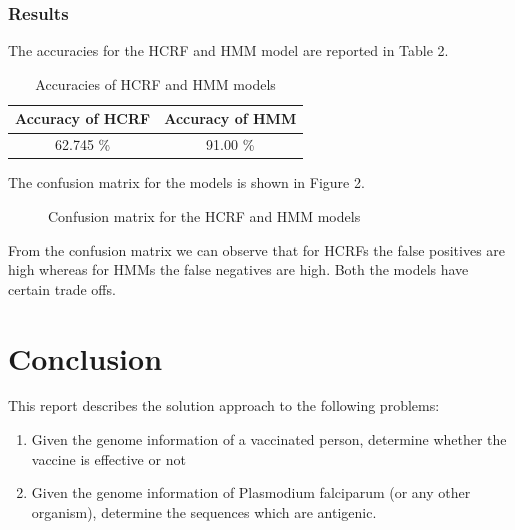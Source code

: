 \documentclass[notitlepage]{article}
\begin{document}
	\subsubsection{Results}
	
	The accuracies for the HCRF and HMM model are reported in Table 2. 
		
	\begin{table}
		\centering
		\caption{Accuracies of HCRF and HMM models}
		\label{Accuracies2}
		\begin{tabular}{|c|c|}
		\hline Accuracy of HCRF & Accuracy of HMM \\ 
		\hline 62.745 \% & 91.00 \% \\ \hline
		\end{tabular}
	\end{table}
	
	The confusion matrix for the models is shown in Figure 2. 
	
		\begin{figure}[!tbp]
		\centering
		\hfill
		\caption{Confusion matrix for the HCRF and HMM models}
	\end{figure} 
	
	From the confusion matrix we can observe that for HCRFs the false positives are high whereas for HMMs the false negatives are high. Both the models have certain trade offs. 	
	
	\section{Conclusion}
	This report describes the solution approach to the following problems:
	\begin{enumerate}
	\item Given the genome information of a vaccinated person, determine whether the vaccine is effective or not
	\item Given the genome information of Plasmodium falciparum (or any other organism), determine the sequences which are antigenic.
	\end{enumerate} 
	
\end{document}
